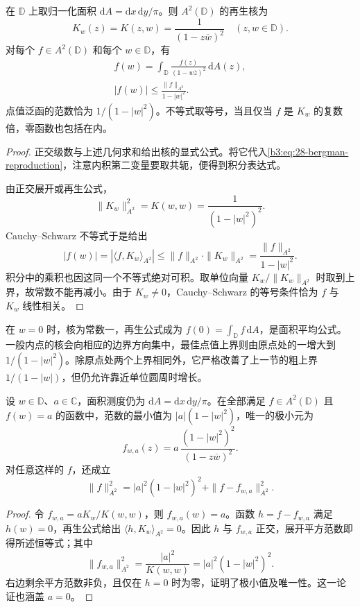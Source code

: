 \begin{theorem}\label{b3:thm:28-bergman-kernel}
在 \(\mathbb D\) 上取归一化面积 \(\mathrm{d}A=\mathrm{d}x\,\mathrm{d}y/\pi\)。则 \(A^2(\mathbb D)\) 的再生核为
\begin{equation}\label{b3:eq:28-bergman-kernel-formula}
 K_w(z)=K(z,w)=\frac1{(1-z\overline w)^2}
 \quad(z,w\in\mathbb D).
\end{equation}
对每个 \(f\in A^2(\mathbb D)\) 和每个 \(w\in\mathbb D\)，有
\begin{equation}\label{b3:eq:28-bergman-evaluation}
 \begin{aligned}
 f(w)=\int_{\mathbb D}\frac{f(z)}{(1-w\overline z)^2}\,\mathrm{d}A(z),
 \\
 |f(w)|\le\frac{\|f\|_{A^2}}{1-|w|^2}.
 \end{aligned}
\end{equation}
点值泛函的范数恰为 \(1/(1-|w|^2)\)。不等式取等号，当且仅当 \(f\) 是 \(K_w\) 的复数倍，零函数也包括在内。
\end{theorem}
\begin{proof}
正交级数与上述几何求和给出核的显式公式。将它代入\eqref{b3:eq:28-bergman-reproduction}，注意内积第二变量要取共轭，便得到积分表达式。

由正交展开或再生公式，
\[
 \|K_w\|_{A^2}^2=K(w,w)=\frac1{(1-|w|^2)^2}.
\]
Cauchy--Schwarz 不等式于是给出
\[
 |f(w)|=|\langle f,K_w\rangle_{A^2}|
 \le\|f\|_{A^2}\cdot\|K_w\|_{A^2}
 =\frac{\|f\|_{A^2}}{1-|w|^2}.
\]
积分中的乘积也因这同一个不等式绝对可积。取单位向量 \(K_w/\|K_w\|_{A^2}\) 时取到上界，故常数不能再减小。由于 \(K_w\ne0\)，Cauchy--Schwarz 的等号条件恰为 \(f\) 与 \(K_w\) 线性相关。
\end{proof}

在 \(w=0\) 时，核为常数一，再生公式成为 \(f(0)=\int_{\mathbb D}f\,\mathrm{d}A\)，是面积平均公式。一般内点的核会向相应的边界方向集中，最佳点值上界则由原点处的一增大到 \(1/(1-|w|^2)\)。除原点处两个上界相同外，它严格改善了上一节的粗上界 \(1/(1-|w|)\)，但仍允许靠近单位圆周时增长。

\begin{corollary}[指定一点值的最小面积范数]\label{b3:cor:28-bergman-extremal}
设 \(w\in\mathbb D\)、\(a\in\mathbb C\)，面积测度仍为 \(\mathrm{d}A=\mathrm{d}x\,\mathrm{d}y/\pi\)。在全部满足 \(f\in A^2(\mathbb D)\) 且 \(f(w)=a\) 的函数中，范数的最小值为 \(|a|(1-|w|^2)\)，唯一的极小元为
\[
 f_{w,a}(z)=a\,\frac{(1-|w|^2)^2}{(1-z\overline w)^2}.
\]
对任意这样的 \(f\)，还成立
\[
 \|f\|_{A^2}^2
 =|a|^2(1-|w|^2)^2+\|f-f_{w,a}\|_{A^2}^2.
\]
\end{corollary}
\begin{proof}
令 \(f_{w,a}=aK_w/K(w,w)\)，则 \(f_{w,a}(w)=a\)。函数 \(h=f-f_{w,a}\) 满足 \(h(w)=0\)，再生公式给出 \(\langle h,K_w\rangle_{A^2}=0\)。因此 \(h\) 与 \(f_{w,a}\) 正交，展开平方范数即得所述恒等式；其中
\[
 \|f_{w,a}\|_{A^2}^2
 =\frac{|a|^2}{K(w,w)}=|a|^2(1-|w|^2)^2.
\]
右边剩余平方范数非负，且仅在 \(h=0\) 时为零，证明了极小值及唯一性。这一论证也涵盖 \(a=0\)。
\end{proof}

